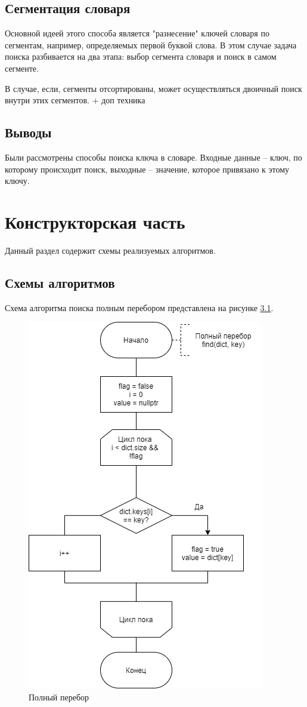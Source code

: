 \documentclass[a4paper,oneside,14pt]{extreport}
\begin{document}
\section{Сегментация словаря}
Основной идеей этого способа является "разнесение" ключей словаря по сегментам, например, определяемых первой буквой слова. В этом случае задача поиска разбивается на два этапа: выбор сегмента словаря и поиск в самом сегменте.\par
В случае, если, сегменты отсортированы, может осуществляться двоичный поиск внутри этих сегментов.
+ доп техника
\section{Выводы}
Были рассмотрены способы поиска ключа в словаре. Входные данные -- ключ, по которому происходит поиск, выходные -- значение, которое привязано к этому ключу.
\newpage

\chapter{Конструкторская часть}
Данный раздел содержит схемы реализуемых алгоритмов.

\section{Схемы алгоритмов}
Схема алгоритма поиска полным перебором представлена на рисунке \ref{fig:plunc}.
\begin{figure}[H]
	\centering
	\includegraphics[scale = 0.65]{images/plunc_search.png}
	\caption{Полный перебор}
	\label{fig:plunc}
\end{figure}
\restoregeometry
\end{document}
